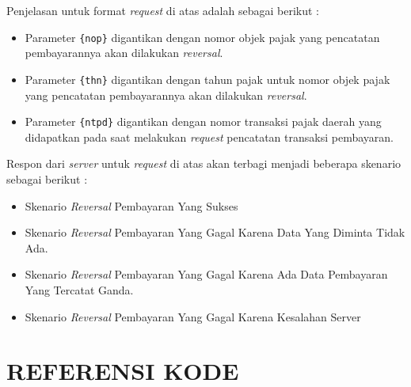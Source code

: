 \documentclass[pdftex,12pt, oneside]{article}
\begin{document}
  Penjelasan untuk format \textit{request} di atas adalah sebagai berikut :
  
  \begin{itemize}
    \item Parameter \texttt{\{nop\}} digantikan dengan nomor objek pajak yang pencatatan pembayarannya akan dilakukan \textit{reversal}.
    \item Parameter \texttt{\{thn\}} digantikan dengan tahun pajak untuk nomor objek pajak yang pencatatan pembayarannya akan dilakukan \textit{reversal}.
    \item Parameter \texttt{\{ntpd\}} digantikan dengan nomor transaksi pajak daerah yang didapatkan pada saat melakukan \textit{request} pencatatan transaksi pembayaran.
  \end{itemize}
  
  Respon dari \textit{server} untuk \textit{request} di atas akan terbagi menjadi beberapa skenario sebagai berikut :
  
  \begin{itemize}
    \item Skenario \textit{Reversal} Pembayaran Yang Sukses
    \item Skenario \textit{Reversal} Pembayaran Yang Gagal Karena Data Yang Diminta Tidak Ada.
    \item Skenario \textit{Reversal} Pembayaran Yang Gagal Karena Ada Data Pembayaran Yang Tercatat Ganda.
    \item Skenario \textit{Reversal} Pembayaran Yang Gagal Karena Kesalahan Server
  \end{itemize}

\section{REFERENSI KODE}
\end{document}
